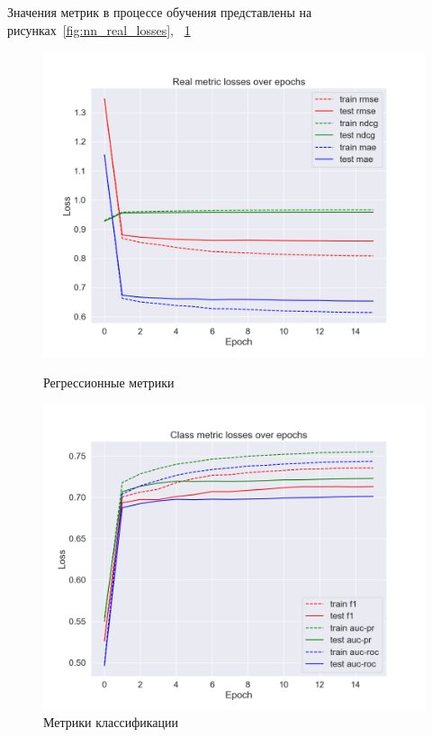 Значения метрик в процессе обучения представлены на рисунках~\ref{fig:nn_real_losses}, ~\ref{fig:nn_class_losses}

\begin{figure}[h!]
\centering
\begin{minipage}{.5\textwidth}
\centering
\includegraphics[width=1.0\linewidth]{images/neural_net/real_losses}
\caption{Регрессионные метрики}
\label{fig:nn_real_losses}
\end{minipage}%
\begin{minipage}{.5\textwidth}
\centering
\includegraphics[width=1.0\linewidth]{images/neural_net/class_losses}
\caption{Метрики классификации}
\label{fig:nn_class_losses}
\end{minipage}
\end{figure}

